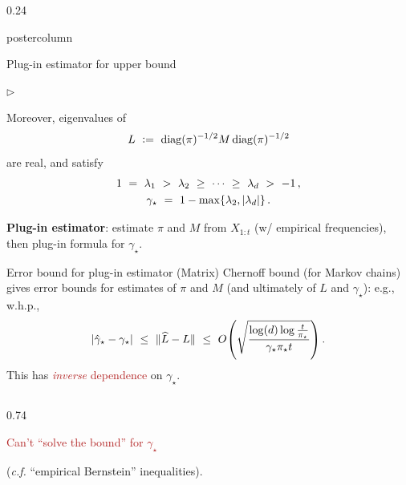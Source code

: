 \documentclass[notheorems,final]{beamer}
\newcommand{\FIREBRICK}[1]{\textcolor{firebrick}{#1}}
\newcommand\pimin{\ensuremath{\pi_{\star}}}
\newcommand\gap{\ensuremath{\gamma_{\star}}}
\newcommand\hatgap{\ensuremath{\hat{\gamma}_{\star}}}
\begin{document}
\begin{frame}{}
\begin{columns}
\begin{column}{0.24\textwidth}
\begin{beamercolorbox}[center,wd=\textwidth]{postercolumn}
\begin{minipage}[T]{.95\textwidth}
{\begin{block}{Plug-in estimator for upper bound}
\begin{list}{$\triangleright$}
                  \item
                    Moreover, eigenvalues of
                    \[
                      L
                      \ := \
                      \operatorname{diag}(\pi)^{-1/2} M \operatorname{diag}(\pi)^{-1/2}
                    \]
                    are real, and satisfy
                    \begin{gather*}
                      1
                      \ = \ \lambda_1 \ > \ \lambda_2 \ \geq \ \dotsb \ \geq \
                      \lambda_d \ > \ -1
                      \,,
                      \\
                      \gap
                      \ = \ 1 - \max\braces{ \lambda_2, \abs{\lambda_d} }
                      \,.
                    \end{gather*}

                  \item
                    \textbf{Plug-in estimator}:
                    estimate $\pi$ and $M$ from $X_{1:t}$ (w/ empirical
                    frequencies), then plug-in formula for $\gap$.

                \end{list}

              \end{block}

              \begin{block}{Error bound for plug-in estimator}
                (Matrix) Chernoff bound {\small(for Markov chains)}
                gives error bounds for estimates of $\pi$ and $M$ (and
                ultimately of $L$ and $\gap$): e.g., w.h.p.,
                \[
                  \abs{\hatgap-\gap}
                  \ \leq \
                  \norm{\wh L - L}
                  \ \leq \
                  O\Parens{
                    \sqrt{\frac{\log(d)\log\frac{t}{\pimin}}{\gap\pimin t}}
                  }
                  \,.
                \]
                This has \FIREBRICK{\emph{inverse} dependence} on $\gap$.

                \begin{columns}
                  \begin{column}{0.74\textwidth}
                    \begin{center}
                      \FIREBRICK{%
                        Can't ``solve the bound'' for $\gap$
                      }

                      {\small(\emph{c.f.} ``empirical Bernstein''
                      inequalities)}.


\end{center}
\end{column}
\end{columns}
\end{block}}
\end{minipage}
\end{beamercolorbox}
\end{column}
\end{columns}
\end{frame}
\end{document}
